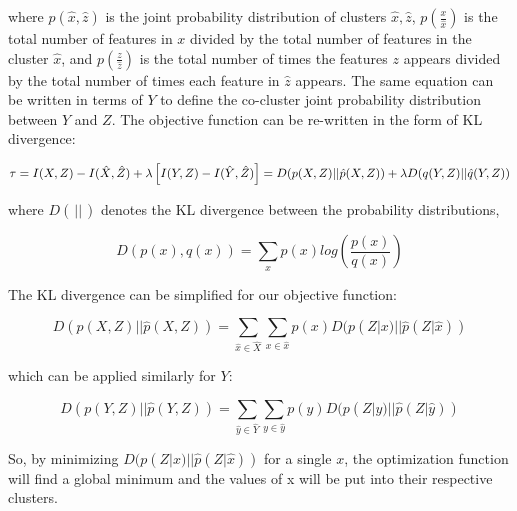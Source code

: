 \documentclass[
]{article}
\begin{document}
where \(p(\hat x, \hat z)\) is the joint probability distribution of
clusters \(\hat x, \hat z\), \(p\left(\frac{x}{\hat x}\right)\) is the
total number of features in \(x\) divided by the total number of
features in the cluster \(\hat x\), and
\(p\left(\frac{z}{\hat z}\right)\) is the total number of times the
features \(z\) appears divided by the total number of times each feature
in \(\hat z\) appears. The same equation can be written in terms of
\(Y\) to define the co-cluster joint probability distribution between
\(Y\) and \(Z\). The objective function can be re-written in the form of
KL divergence:

\[\tau = I(X, Z) - I(\hat X, \hat Z) + \lambda\left[I(Y, Z) - I(\hat Y, \hat Z)\right] = \\D(p(X, Z)||\hat p(X, Z)) + \lambda D(q(Y, Z)||\hat q(Y, Z))\]

where \(D(\frac{}{}||\frac{}{})\) denotes the KL divergence between the
probability distributions,

\[D(p(x), q(x)) = \sum_xp(x)log\left(\frac{p(x)}{q(x)}\right)\]

The KL divergence can be simplified for our objective function:

\[D(p(X, Z)||\hat p(X, Z)) = \sum_{\hat x\in \hat X}\sum_{x\in \hat x}p(x)D(p(Z|x)||\hat p(Z|\hat x))\]

which can be applied similarly for \(Y\):

\[D(p(Y, Z)||\hat p(Y, Z)) = \sum_{\hat y\in \hat Y}\sum_{y\in \hat y}p(y)D(p(Z|y)||\hat p(Z|\hat y))\]

So, by minimizing \(D(p(Z|x)||\hat p(Z|\hat x))\) for a single \(x\),
the optimization function will find a global minimum and the values of x
will be put into their respective clusters.
\end{document}
